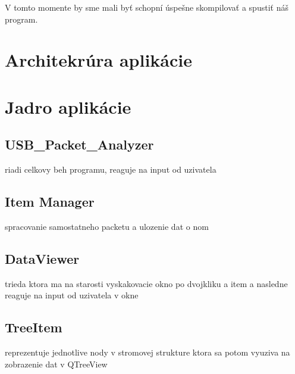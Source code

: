\begin{itemize}
V tomto momente by sme mali byť schopní úspešne skompilovať a spustiť náš program.
\end{itemize}



























\newpage
\section{Architekrúra aplikácie}
\section{Jadro aplikácie}
\subsection{USB\_Packet\_Analyzer}
riadi celkovy beh programu, reaguje na input od uzivatela
\subsection{Item Manager}
spracovanie samostatneho packetu a ulozenie dat o nom
\subsection{DataViewer}
trieda ktora ma na starosti vyskakovacie okno po dvojkliku a item a nasledne reaguje na input od uzivatela v okne
\subsection{TreeItem}
reprezentuje jednotlive nody v stromovej strukture ktora sa potom vyuziva na zobrazenie dat v QTreeView
